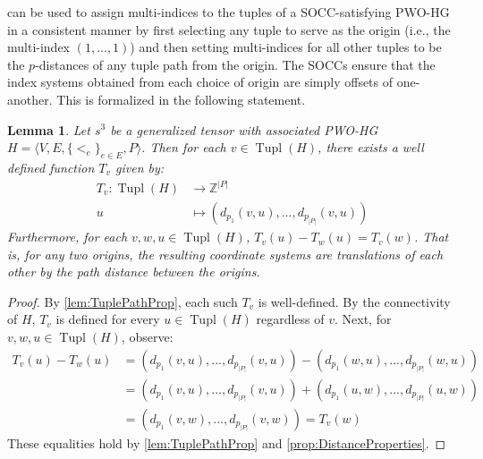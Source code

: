 \documentclass{article}
\theoremstyle{plain}
\newtheorem{lemma}[theorem]{Lemma}
\theoremstyle{definition}
\theoremstyle{remark}
\DeclareMathOperator{\tup}{Tupl}
\begin{document}
 can be used to assign multi-indices to the tuples of a SOCC-satisfying PWO-HG in a consistent manner by first selecting any tuple to serve as the origin (i.e., the multi-index $(1, ..., 1)$) and then setting multi-indices for all other tuples to be the $p$-distances of any tuple path from the origin. The SOCCs ensure that the index systems obtained from each choice of origin are simply offsets of one-another. This is formalized in the following statement.
\begin{lemma}
	Let $s^3$ be a generalized tensor with associated PWO-HG $H = \big\langle V, E, \{<_e\}_{e \in E}, P \big\rangle$. Then for each $v \in \tup(H)$, there exists a well defined function $T_v$ given by: 
	\begin{equation*}
		\begin{aligned}
			T_v: \tup(H) &\rightarrow \mathbb{Z}^{|P|}\\
			u &\mapsto (d_{p_1}(v, u), ..., d_{p_{|P|}}(v, u))
		\end{aligned}
	\end{equation*}
	Furthermore, for each $v, w, u \in \tup(H)$, $T_v(u) - T_w(u)= T_v(w)$. That is, for any two origins, the resulting coordinate systems are translations of each other by the path distance between the origins.
	\label{lem:CoTensors}
\end{lemma}
\begin{proof}
	By \cref{lem:TuplePathProp}, each such $T_v$ is well-defined. By the connectivity of $H$, $T_v$ is defined for every $u \in \tup(H)$ regardless of $v$. Next, for $v, w, u \in \tup(H)$, observe:
	\begin{equation*}
		\begin{aligned}
			T_v(u) - T_w(u) &= (d_{p_1}(v, u), ..., d_{p_{|P|}}(v, u)) - (d_{p_1}(w, u), ..., d_{p_{|P|}}(w, u))\\
			&= (d_{p_1}(v, u), ..., d_{p_{|P|}}(v, u)) + (d_{p_1}(u, w), ..., d_{p_{|P|}}(u, w))\\
			&= (d_{p_1}(v, w), ..., d_{p_{|P|}}(v, w)) = T_v(w)
		\end{aligned}
	\end{equation*}
	These equalities hold by \cref{lem:TuplePathProp} and \cref{prop:DistanceProperties}. 
\end{proof}
\end{document}
